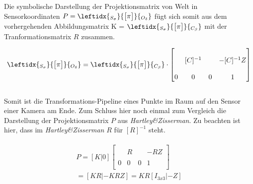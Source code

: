 		Die symbolische Darstellung der Projektionsmatrix von Welt in Sensorkoordinaten $	P = \leftidx{_{S_\sigma}}{\begin{bmatrix}
			\pi
			\end{bmatrix}}{_{O_\delta}}$ fügt sich somit aus dem vorhergehenden Abbildungsmatrix 
		K = $\leftidx{_{S_\sigma}}{\begin{bmatrix}
				\pi
		\end{bmatrix}}{_{C_\beta}}$ mit der Tranformationsmatrix $R$ zusammen.
		
		\begin{gather}
		\leftidx{_{S_\sigma}}{\begin{bmatrix}
			\pi
			\end{bmatrix}}{_{O_\delta}}
		=
		\leftidx{_{S_\sigma}}{\begin{bmatrix}
			\pi
			\end{bmatrix}}{_{C_\beta}}
		\cdot
		\begin{bmatrix}
		&&&\\
		&[C]^{-1}&& -[C]^{-1} Z\\
		&&&\\
		0&0&0&1\\
		\end{bmatrix}
		\end{gather}\\
		
	Somit ist die Transformations-Pipeline eines Punkte im Raum auf den Sensor einer Kamera am Ende. 
Zum Schluss hier noch einmal zum Vergleich die Darstellung der Projektionsmatrix $P$ aus \textit{Hartley\&Zisserman}\cite{HZ}. Zu beachten ist hier, dass im \textit{Hartley\&Zisserman} $R$ für $[R]^{-1}$ steht\cite{HZ}.
		
		\begin{gather}
		\begin{split}	
		P=
		[K|0] \begin{bmatrix}
		&&&\\
		&R&&-RZ\\
		&&&\\
		0&0&0&1\\
		\end{bmatrix}\\
		=[KR|-KRZ] 	= KR[I_{3x3}|-Z]
		\end{split}
		\end{gather}
